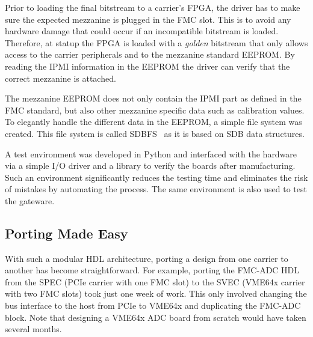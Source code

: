 \documentclass{JAC2003}
\begin{document}
Prior to loading the final bitstream to a carrier's FPGA, the driver has to make sure the expected mezzanine is plugged in the FMC slot.
This is to avoid any hardware damage that could occur if an incompatible bitstream is loaded.
Therefore, at statup the FPGA is loaded with a \textit{golden} bitstream that only allows access to the carrier peripherals and to the mezzanine standard EEPROM.
By reading the IPMI information in the EEPROM the driver can verify that the correct mezzanine is attached.

The mezzanine EEPROM does not only contain the IPMI part as defined in the FMC standard, but also other mezzanine specific data such as calibration values.
To elegantly handle the different data in the EEPROM, a simple file system was created.
This file system is called SDBFS~\cite{sdbfs} as it is based on SDB data structures.



A test environment was developed in Python and interfaced with the hardware via a simple I/O driver and a library to verify the boards after manufacturing.
Such an environment significantly reduces the testing time and eliminates the risk of mistakes by automating the process.
The same environment is also used to test the gateware.

\subsection{Porting Made Easy}
With such a modular HDL architecture, porting a design from one carrier to another has become straightforward.
For example, porting the FMC-ADC HDL from the SPEC (PCIe carrier with one FMC slot) to the SVEC (VME64x carrier with two FMC slots) took just one week of work.
This only involved changing the bus interface to the host from PCIe to VME64x and duplicating the FMC-ADC block.
Note that designing a VME64x ADC board from scratch would have taken several months.
\end{document}
